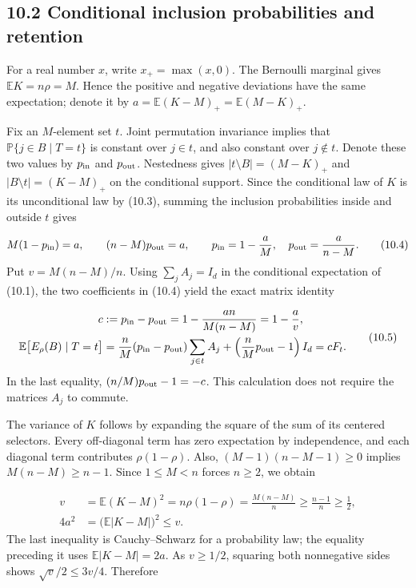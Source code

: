 \documentclass[11pt,a4paper]{article}
\begin{document}
\subsection*{10.2 Conditional inclusion probabilities and retention}
For a real number \(x\), write \(x_+=\max(x,0)\). The Bernoulli marginal gives \(\mathbb EK=n\rho=M\). Hence the positive and negative deviations have the same expectation; denote it by \(a=\mathbb E(K-M)_+=\mathbb E(M-K)_+\).

Fix an \(M\)-element set \(t\). Joint permutation invariance implies that \(\mathbb P\{j\in B\mid T=t\}\) is constant over \(j\in t\), and also constant over \(j\notin t\). Denote these two values by \(p_{\rm in}\) and \(p_{\rm out}\). Nestedness gives \(|t\setminus B|=(M-K)_+\) and \(|B\setminus t|=(K-M)_+\) on the conditional support. Since the conditional law of \(K\) is its unconditional law by (10.3), summing the inclusion probabilities inside and outside \(t\) gives

\begin{equation}
M(1-p_{\rm in})=a,\qquad (n-M)p_{\rm out}=a,
\qquad
p_{\rm in}=1-\frac aM,\quad
p_{\rm out}=\frac a{n-M}.
\tag{10.4}
\end{equation}
Put \(v=M(n-M)/n\). Using \(\sum_jA_j=I_d\) in the conditional expectation of (10.1), the two coefficients in (10.4) yield the exact matrix identity

\begin{equation}
\begin{aligned}
c&:=p_{\rm in}-p_{\rm out}
=1-\frac{an}{M(n-M)}=1-\frac av,\\
\mathbb E\bigl[E_\rho(B)\mid T=t\bigr]
&=\frac nM(p_{\rm in}-p_{\rm out})\sum_{j\in t}A_j
 +\left(\frac nM p_{\rm out}-1\right)I_d
=cF_t.
\end{aligned}
\tag{10.5}
\end{equation}
In the last equality, \((n/M)p_{\rm out}-1=-c\). This calculation does not require the matrices \(A_j\) to commute.

The variance of \(K\) follows by expanding the square of the sum of its centered selectors. Every off-diagonal term has zero expectation by independence, and each diagonal term contributes \(\rho(1-\rho)\). Also, \((M-1)(n-M-1)\ge0\) implies \(M(n-M)\ge n-1\). Since \(1\le M<n\) forces \(n\ge2\), we obtain

\begin{equation}
\begin{aligned}
v&=\mathbb E(K-M)^2=n\rho(1-\rho)
=\frac{M(n-M)}n\ge\frac{n-1}{n}\ge\frac12,\\
4a^2&=\bigl(\mathbb E|K-M|\bigr)^2\le v.
\end{aligned}
\tag{10.6}
\end{equation}
The last inequality is Cauchy--Schwarz for a probability law; the equality preceding it uses \(\mathbb E|K-M|=2a\). As \(v\ge1/2\), squaring both nonnegative sides shows \(\sqrt v/2\le3v/4\). Therefore
\end{document}
